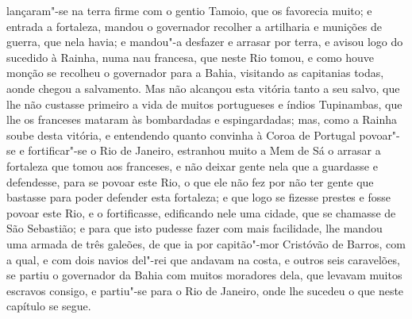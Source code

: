 lançaram"-se na terra firme com o gentio Tamoio, que os favorecia muito; e entrada a
fortaleza, mandou o governador recolher a artilharia e munições de guerra, que nela havia;
e mandou"-a desfazer e arrasar por terra, e avisou logo do sucedido à Rainha, numa nau
francesa, que neste Rio tomou, e como houve monção se recolheu o governador para a Bahia,
visitando as capitanias todas, aonde chegou a salvamento. Mas não alcançou esta vitória
tanto a seu salvo, que lhe não custasse primeiro a vida de muitos portugueses e índios
Tupinambas, que lhe os franceses mataram às bombardadas e espingardadas; mas, como a
Rainha soube desta vitória, e entendendo quanto convinha à Coroa de Portugal povoar"-se e
fortificar"-se o Rio de Janeiro, estranhou muito a Mem de Sá o arrasar a fortaleza que
tomou aos franceses, e não deixar gente nela que a guardasse e defendesse, para se povoar
este Rio, o que ele não fez por não ter gente que bastasse para poder defender esta
fortaleza; e que logo se fizesse prestes e fosse povoar este Rio, e o fortificasse,
edificando nele uma cidade, que se chamasse de São Sebastião; e para que isto pudesse
fazer com mais facilidade, lhe mandou uma armada de três galeões, de que ia por
capitão"-mor Cristóvão de Barros, com a qual, e com dois navios del"-rei que andavam na
costa, e outros seis caravelões, se partiu o governador da Bahia com muitos moradores
dela, que levavam muitos escravos consigo, e partiu"-se para o Rio de Janeiro, onde lhe
sucedeu o que neste capítulo se segue.

